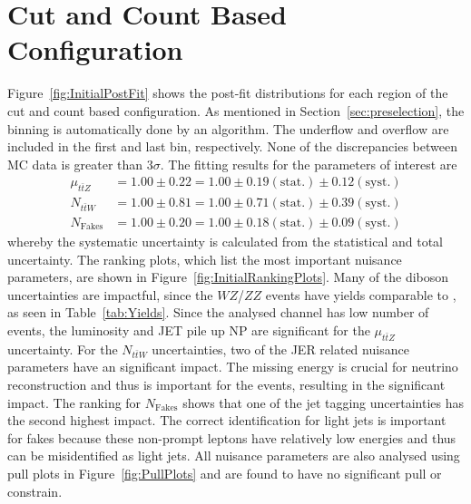 \documentclass[bachelor,oneside, BCOR10mm,
			ngerman,english  %
]{GAUBM}
\begin{document}
\section*{Cut and Count Based Configuration}
\label{sec:InitialConfigurationResults}
Figure~\ref{fig:InitialPostFit} shows the post-fit distributions for each region of the cut and count based configuration. As mentioned in Section~\ref{sec:preselection}, the binning is automatically done by an algorithm. The underflow and overflow are included in the first and last bin, respectively. None of the discrepancies between MC data is greater than $3\sigma$. The fitting results for the parameters of interest are 
\begin{align}
	\mu_{t\bar{t}Z} &= 1.00\pm0.22 = 1.00\pm0.19(\text{stat.})\pm0.12(\text{syst.})\\
	N_{t\bar{t}W} 	&= 1.00\pm0.81 = 1.00\pm0.71(\text{stat.})\pm0.39(\text{syst.})\\
	N_\text{Fakes} 	&= 1.00\pm0.20 = 1.00\pm0.18(\text{stat.})\pm0.09(\text{syst.})
\end{align}
whereby the systematic uncertainty is calculated from the statistical and total uncertainty. The ranking plots, which list the most important nuisance parameters, are shown in Figure~\ref{fig:InitialRankingPlots}. Many of the diboson uncertainties are impactful, since the $WZ$/$ZZ$ events have yields comparable to \ttbarW, as seen in Table~\ref{tab:Yields}. Since the analysed channel has low number of events, the luminosity and JET pile up NP are significant for the $\mu_{t\bar{t}Z}$ uncertainty. For the $N_{t\bar{t}W}$ uncertainties, two of the JER related nuisance parameters have an significant impact. The missing energy is crucial for neutrino reconstruction and thus is important for the \ttbarW events, resulting in the significant impact. The ranking for $N_\text{Fakes}$ shows that one of the jet tagging uncertainties has the second highest impact. The correct identification for light jets is important for fakes because these non-prompt leptons have relatively low energies and thus can be misidentified as light jets. All nuisance parameters are also analysed using pull plots in Figure~\ref{fig:PullPlots} and are found to have no significant pull or constrain.
\end{document}

